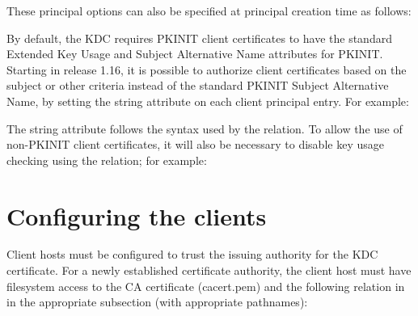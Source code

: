 \documentclass[letterpaper,10pt,english]{sphinxmanual}
\begin{document}
These principal options can also be specified at principal creation
time as follows:

%
\begin{sphinxVerbatim}[commandchars=\\\{\}]
  
\end{sphinxVerbatim}

By default, the KDC requires PKINIT client certificates to have the
standard Extended Key Usage and Subject Alternative Name attributes
for PKINIT.  Starting in release 1.16, it is possible to authorize
client certificates based on the subject or other criteria instead of
the standard PKINIT Subject Alternative Name, by setting the
 string attribute on each client principal entry.
For example:

%
\begin{sphinxVerbatim}[commandchars=\\\{\}]
    
\end{sphinxVerbatim}

The  string attribute follows the syntax used by
the {\hyperref[\detokenize{admin/conf_files/krb5_conf:krb5-conf-5}]{}}  relation.  To allow the
use of non-PKINIT client certificates, it will also be necessary to
disable key usage checking using the  relation;
for example:

%
\begin{sphinxVerbatim}[commandchars=\\\{\}]
\PYG{p}{[}\PYG{p}{]}
      
\end{sphinxVerbatim}


\section{Configuring the clients}
\label{\detokenize{admin/pkinit:configuring-the-clients}}
Client hosts must be configured to trust the issuing authority for the
KDC certificate.  For a newly established certificate authority, the
client host must have filesystem access to the CA certificate
(cacert.pem) and the following relation in {\hyperref[\detokenize{admin/conf_files/krb5_conf:krb5-conf-5}]{}} in the
appropriate {\hyperref[\detokenize{admin/conf_files/krb5_conf:realms}]{}} subsection (with appropriate pathnames):
\end{document}
